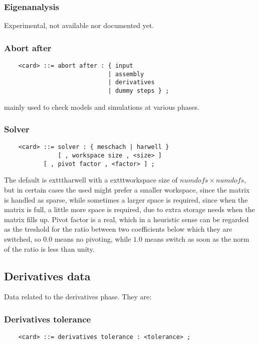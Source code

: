 \subsubsection{Eigenanalysis}
Experimental, not available nor documented yet.

\subsubsection{Abort after}
\begin{verbatim}
    <card> ::= abort after : { input 
                             | assembly 
                             | derivatives 
                             | dummy steps } ;
\end{verbatim}
mainly used to check models and simulations at various phases.

\subsubsection{Solver}   
\begin{verbatim}
    <card> ::= solver : { meschach | harwell }
               [ , workspace size , <size> ] 
	       [ , pivot factor , <factor> ] ;
\end{verbatim}
The default is 	exttt{harwell} with a 	exttt{workspace size}
of $ numdofs\times{numdofs} $, but in certain cases the used
might prefer a smaller workspace, since the matrix is handled as sparse,
while sometimes a larger space is required, since when the matrix is
full, a little more space is required, due to extra storage needs when
the matrix fills up.
Pivot factor is a real, which in a heuristic sense can be regarded as
the treshold for the ratio between two coefficients below which they are
switched, so $ 0.0 $ means no pivoting, while $ 1.0 $ means switch as
soon as the norm of the ratio is less than unity.



\subsection{Derivatives data}
Data related to the derivatives phase. They are:


\subsubsection{Derivatives tolerance}
\begin{verbatim}
    <card> ::= derivatives tolerance : <tolerance> ;
\end{verbatim}

